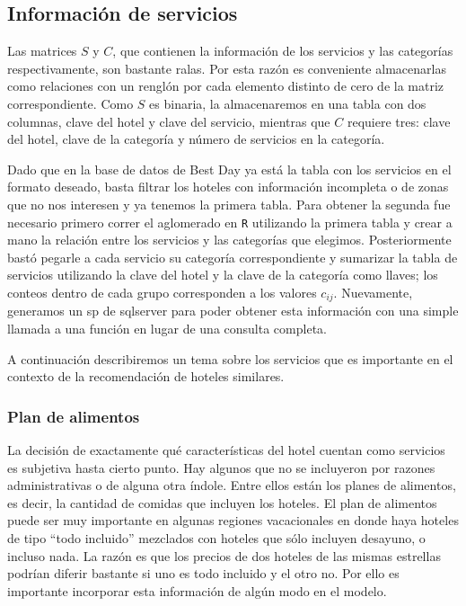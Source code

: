 \documentclass[12pt]{report}
\begin{document}
\subsection*{Información de servicios}

Las matrices $S$ y $C$, que contienen la información de los servicios y las categorías respectivamente, son bastante ralas. Por esta razón es conveniente almacenarlas como relaciones con un renglón por cada elemento distinto de cero de la matriz correspondiente. Como $S$ es binaria, la almacenaremos en una tabla con dos columnas, clave del hotel y clave del servicio, mientras que $C$ requiere tres: clave del hotel, clave de la categoría y número de servicios en la categoría.

Dado que en la base de datos de Best Day ya está la tabla con los servicios en el formato deseado, basta filtrar los hoteles con información incompleta o de zonas que no nos interesen y ya tenemos la primera tabla. Para obtener la segunda fue necesario primero correr el aglomerado en \texttt{R} utilizando la primera tabla y crear a mano la relación entre los servicios y las categorías que elegimos. Posteriormente bastó pegarle a cada servicio su categoría correspondiente y sumarizar la tabla de servicios utilizando la clave del hotel y la clave de la categoría como llaves; los conteos dentro de cada grupo corresponden a los valores $c_{ij}$. Nuevamente, generamos un \gls{sp} de \gls{sqlserver} para poder obtener esta información con una simple llamada a una función en lugar de una consulta completa.

A continuación describiremos un tema sobre los servicios que es importante en el contexto de la recomendación de hoteles similares.

\subsubsection*{Plan de alimentos}

La decisión de exactamente qué características del hotel cuentan como servicios es subjetiva hasta cierto punto. Hay algunos que no se incluyeron por razones administrativas o de alguna otra índole. Entre ellos están los planes de alimentos, es decir, la cantidad de comidas que incluyen los hoteles. El plan de alimentos puede ser muy importante en algunas regiones vacacionales en donde haya hoteles de tipo ``todo incluido'' mezclados con hoteles que sólo incluyen desayuno, o incluso nada. La razón es que los precios de dos hoteles de las mismas estrellas podrían diferir bastante si uno es todo incluido y el otro no. Por ello es importante incorporar esta información de algún modo en el modelo.
\end{document}
